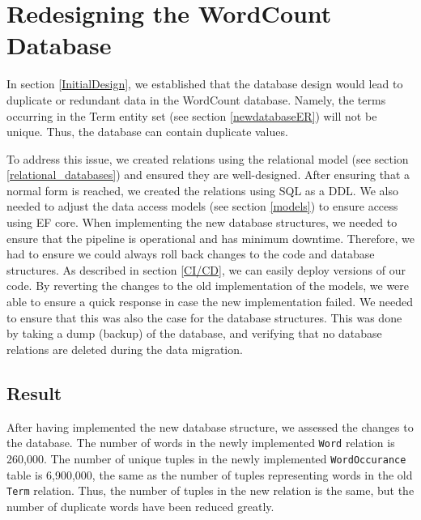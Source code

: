\section{Redesigning the WordCount Database}
In section \ref{InitialDesign}, we established that the database design would lead to duplicate or redundant data in the WordCount database.
Namely, the terms occurring in the Term entity set (see section \ref{newdatabaseER}) will not be unique. 
Thus, the database can contain duplicate values.
 
To address this issue, we created relations using the relational model (see section \ref{relational_databases}) and ensured they are well-designed.
After ensuring that a normal form is reached, we created the relations using SQL as a DDL.
We also needed to adjust the data access models (see section \ref{models}) to ensure access using EF core.
When implementing the new database structures, we needed to ensure that the pipeline is operational and has minimum downtime. 
Therefore, we had to ensure we could always roll back changes to the code and database structures.
As described in section \ref{CI/CD}, we can easily deploy versions of our code.
By reverting the changes to the old implementation of the models, we were able to ensure a quick response in case the new implementation failed.
We needed to ensure that this was also the case for the database structures.
This was done by taking a dump (backup) of the database, and verifying that no database relations are deleted during the data migration.




\subsection{Result}
After having implemented the new database structure, we assessed the changes to the database. 
The number of words in the newly implemented \texttt{Word} relation is 260,000.
The number of unique tuples in the newly implemented \texttt{WordOccurance} table is 6,900,000, the same as the number of tuples representing words in the old \texttt{Term} relation.
Thus, the number of tuples in the new relation is the same, but the number of duplicate words have been reduced greatly.

